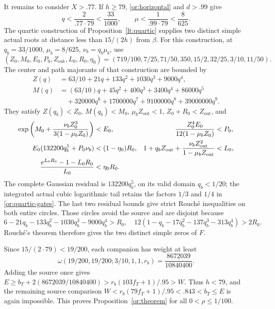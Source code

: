 It remains to consider $X>.77$.  If $h\ge79$,
\eqref{or:horizontal} and $d>.99$ give
\begin{equation}\label{or:base-quartic-entry}
             q<\frac2{.77\cdot79}<\frac{33}{1000},
             \qquad \mu<\frac1{.99\cdot79}<\frac8{625}.
\end{equation}
The quartic construction of Proposition~\ref{lt:quartic} supplies two
distinct simple actual roots at distance less than $15/(2h)$ from
$\beta$.  For this construction, at $q_b=33/1000$, $\mu_b=8/625$,
$\nu_b=q_b\mu_b$,
use
\[
 (Z_0,M_0,E_0,P_0,Z_{\mathrm{out}},L_0,R_0,\eta_0)
   =(719/100,7/25,71/50,350,15/2,32/25,3/10,11/50).
\]
The center and path majorants of that construction are bounded by
\[
 \begin{split}
 Z(q)&=63/10+21q+133q^2+1030q^3+9000q^4,\\
 M(q)&=(63/10)q+45q^2+400q^3+3400q^4+86000q^5\\
     &\quad+320000q^6+1700000q^7+9100000q^8+39000000q^9.
 \end{split}
\]
They satisfy $Z(q_b)<Z_0$, $M(q_b)<M_0$,
$\mu_bZ_{\mathrm{out}}<1$, $Z_0+R_0<Z_{\mathrm{out}}$, and
\begin{align}
 \exp\left(M_0+\frac{\nu_bZ_0^3}{3(1-\mu_bZ_0)}\right)&<E_0,
 &\frac{Z_0^4E_0}{12(1-\mu_bZ_0)}&<P_0,\notag\\
 E_0(132200q_b^5+P_0\nu_b)&<(1-\eta_0)R_0,
 &1+q_bZ_{\mathrm{out}}+
 \frac{\nu_bZ_{\mathrm{out}}^2}{1-\mu_bZ_{\mathrm{out}}}&<L_0,
 \label{or:quartic-gates}\\
 \frac{e^{L_0R_0}-1-L_0R_0}{L_0}&<\eta_0R_0.&&\notag
\end{align}
The complete Gaussian residual is $132200q_b^5$, on its valid
domain $q_b<1/20$; the integrated actual cubic logarithmic tail
retains the factors $1/3$ and $1/4$ in
\eqref{or:quartic-gates}.  The last two residual bounds give strict
Rouch\'e inequalities on both entire circles.  Those circles avoid
the source and are disjoint because
\[
 6-21q_b-133q_b^2-1030q_b^3-9000q_b^4>R_0,
 \quad
 12(1-q_b-17q_b^2-137q_b^3-313q_b^4)>2R_0.
\]
Rouch\'e's theorem therefore gives the two distinct simple zeros of $F$.

Since $15/(2\cdot79)<19/200$, each companion has weight at least
\[
 \omega(19/200,19/200;3/10,1,1,r_b)
                         =\frac{8672039}{10840400}.
\]
Adding the source once gives
$E\ge b_T+2(8672039/10840400)>r_b(103f_T+1)/.95>W$.
Thus $h<79$, and the remaining source comparison
$W<r_b(79f_T+1)/.95<.843<b_T\le E$ is again impossible.
This proves Proposition~\ref{or:theorem} for all $0<\rho\le1/100$.

